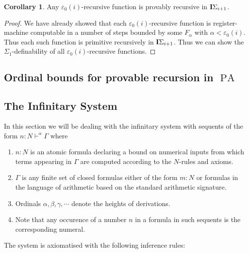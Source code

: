\documentclass[8pt]{article}
\theoremstyle{definition}
\theoremstyle{definition}
\theoremstyle{definition}
\theoremstyle{definition}
\theoremstyle{definition}
\theoremstyle{definition}
\theoremstyle{definition}
\theoremstyle{definition}
\theoremstyle{definition}
\theoremstyle{definition}
\theoremstyle{definition}
\theoremstyle{definition}
\theoremstyle{definition}
\newtheorem{col}{Corollary}[section]
\theoremstyle{question}
\begin{document}
\begin{col}
  Any $\varepsilon_0(i)$-recursive function is provably recursive in ${\bf I}\Sigma_{i + 1}$.
\end{col}

\begin{proof}
  We have already showed that each $\varepsilon_0(i)$-recursive function is register-machine computable
  in a number of steps bounded by some $F_{\alpha}$ with $\alpha < \varepsilon_0(i)$.
  Thus each such function is primitive recursively in ${\bf I}\Sigma_{i + 1}$. Thus we can show the
  $\Sigma_1$-definability of all $\varepsilon_0(i)$-recursive functions.
\end{proof}

\subsection{Ordinal bounds for provable recursion in $\operatorname{PA}$}

\subsection{The Infinitary System}

In this section we will be dealing with the infinitary system with 
sequents of the form $n : N \vdash^{\alpha} \Gamma$ where
\begin{enumerate}
  \item $n : N$ is an atomic formula declaring a bound on numerical inputs from
  which terms appearing in $\Gamma$ are computed according to the $N$-rules and axioms.
  \item $\Gamma$ is any finite set of closed formulas either of the form
  $m : N$ or formulas in the language of arithmetic based on the standard arithmetic signature.
  \item Ordinals $\alpha, \beta, \gamma, \cdots$ denote the heights of derivations.
  \item Note that any occurence of a number $n$ in a formula in such sequents 
  is the corresponding numeral.
\end{enumerate}

The system is axiomatised with the following inference rules:

\begin{prooftree}
\end{prooftree}
\end{document}
